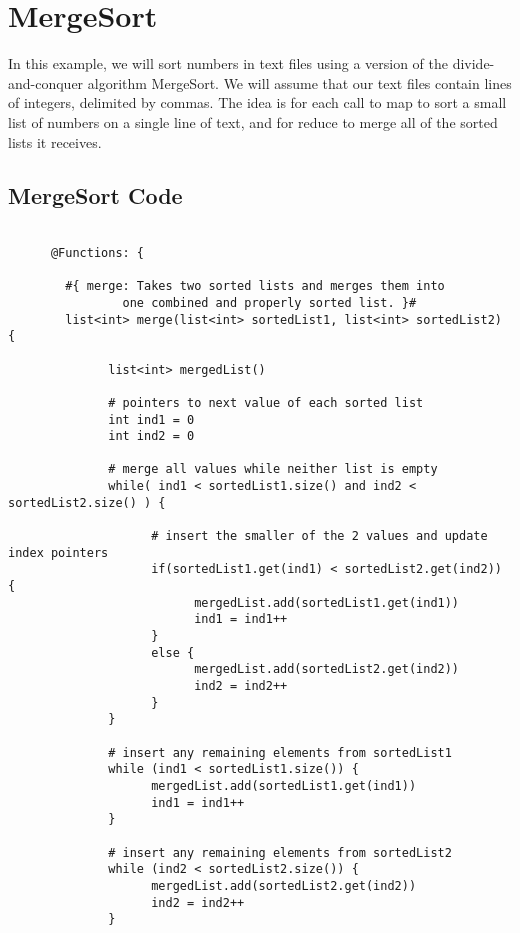 \documentclass{article} \usepackage{fancyhdr, multicol}
\begin{document}
\section*{MergeSort} \label{merge_sort} 

In this example, we will sort numbers in text files using a version of the
divide-and-conquer algorithm MergeSort. We will assume that our text files contain
lines of integers, delimited by commas. The idea is for each call to map to sort a
small list of numbers on a single line of text, and for reduce to merge all of the
sorted lists it receives.

\subsection*{MergeSort Code}
\begin{verbatim}

      @Functions: {

        #{ merge: Takes two sorted lists and merges them into
                one combined and properly sorted list. }#
        list<int> merge(list<int> sortedList1, list<int> sortedList2) {

              list<int> mergedList()

              # pointers to next value of each sorted list
              int ind1 = 0
              int ind2 = 0

              # merge all values while neither list is empty
              while( ind1 < sortedList1.size() and ind2 < sortedList2.size() ) {

                    # insert the smaller of the 2 values and update index pointers
                    if(sortedList1.get(ind1) < sortedList2.get(ind2)) {
                          mergedList.add(sortedList1.get(ind1))
                          ind1 = ind1++
                    }
                    else { 
                          mergedList.add(sortedList2.get(ind2))
                          ind2 = ind2++
                    }
              }

              # insert any remaining elements from sortedList1
              while (ind1 < sortedList1.size()) {
                    mergedList.add(sortedList1.get(ind1))
                    ind1 = ind1++
              }

              # insert any remaining elements from sortedList2
              while (ind2 < sortedList2.size()) {
                    mergedList.add(sortedList2.get(ind2))
                    ind2 = ind2++
              }


\end{verbatim}
\end{document}
